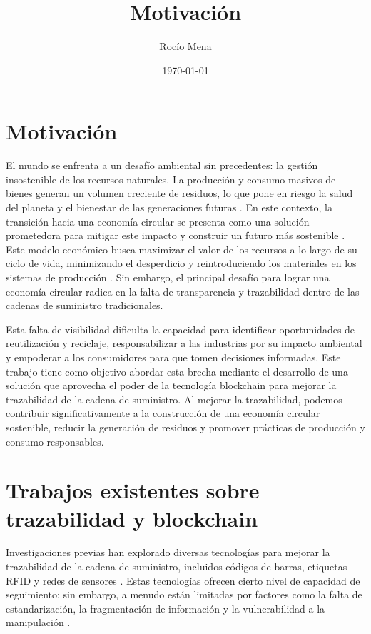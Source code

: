 \documentclass[main.tex]{subfiles}
\title{Motivación}
\author{Rocío Mena}
\date{\today}
\begin{document}
\maketitle

\section{Motivación}

El mundo se enfrenta a un desafío ambiental sin precedentes: la gestión insostenible de los recursos naturales. La producción y consumo masivos de bienes generan un volumen creciente de residuos, lo que pone en riesgo la salud del planeta y el bienestar de las generaciones futuras \cite{IPCC2022, pelegri2021ipcc}. En este contexto, la transición hacia una economía circular se presenta como una solución prometedora para mitigar este impacto y construir un futuro más sostenible \cite{clima2022book}. Este modelo económico busca maximizar el valor de los recursos a lo largo de su ciclo de vida, minimizando el desperdicio y reintroduciendo los materiales en los sistemas de producción \cite{da2022economia, melendez2021economia}. Sin embargo, el principal desafío para lograr una economía circular radica en la falta de transparencia y trazabilidad dentro de las cadenas de suministro tradicionales.

Esta falta de visibilidad dificulta la capacidad para identificar oportunidades de reutilización y reciclaje, responsabilizar a las industrias por su impacto ambiental y empoderar a los consumidores para que tomen decisiones informadas. Este trabajo tiene como objetivo abordar esta brecha mediante el desarrollo de una solución que aprovecha el poder de la tecnología blockchain para mejorar la trazabilidad de la cadena de suministro. Al mejorar la trazabilidad, podemos contribuir significativamente a la construcción de una economía circular sostenible, reducir la generación de residuos y promover prácticas de producción y consumo responsables.

\section{Trabajos existentes sobre trazabilidad y blockchain}

Investigaciones previas han explorado diversas tecnologías para mejorar la trazabilidad de la cadena de suministro, incluidos códigos de barras, etiquetas RFID y redes de sensores \cite{schuitemaker2020product}. Estas tecnologías ofrecen cierto nivel de capacidad de seguimiento; sin embargo, a menudo están limitadas por factores como la falta de estandarización, la fragmentación de información y la vulnerabilidad a la manipulación \cite{schuitemaker2020product}.
\end{document}
